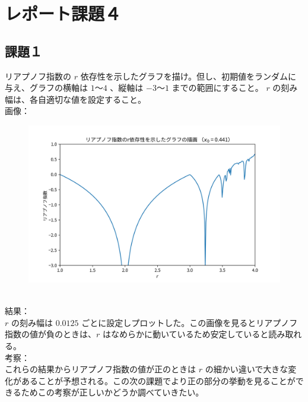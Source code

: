 \section{レポート課題４}
\subsection{課題１}
リアプノフ指数の $r$ 依存性を示したグラフを描け。但し、初期値をランダムに与え、グラフの横軸は $1 〜 4$ 、縦軸は $-3 〜 1$ までの範囲にすること。 $r$ の刻み幅は、各自適切な値を設定すること。\\
画像：\\
\begin{figure}[htbp]
  \centering
  \includegraphics[keepaspectratio, scale=0.5]{images/Problem4/task4_1.png}
\end{figure}\\
結果：\\
$r$ の刻み幅は $0.0125$ ごとに設定しプロットした。この画像を見るとリアプノフ指数の値が負のときは、$r$ はなめらかに動いているため安定していると読み取れる。\\
考察：\\
これらの結果からリアプノフ指数の値が正のときは $r$ の細かい違いで大きな変化があることが予想される。この次の課題でより正の部分の挙動を見ることができるためこの考察が正しいかどうか調べていきたい。\\

\newpage
